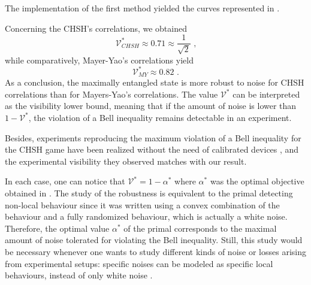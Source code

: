 The implementation of the first method yielded the curves represented in 
.

\begin{Figure}
\centering

\label{fig:curve-noise}
\end{Figure}

Concerning the CHSH's correlations, we obtained
\begin{equation*}
    \mathcal V ^*_{CHSH} \approx 0.71  \approx \frac{1}{\sqrt{2}}\text{ ,}
\end{equation*}
while comparatively, Mayer-Yao's correlations yield
\begin{equation*}
\mathcal{V}^*_{MY} \approx 0.82\text{ .}
\end{equation*}
As a conclusion, the maximally entangled state is more robust
to noise for CHSH correlations than for Mayers-Yao's correlations. The value $
\mathcal{V}^*$ can be interpreted as the visibility lower bound, meaning that if
the amount of noise is lower than $1-\mathcal{V}^*$, the violation of a Bell
inequality remains detectable in an experiment.

Besides, experiments reproducing the maximum violation of a Bell inequality for the CHSH
game have been realized without the need of calibrated devices
\cite{shadbolt2012}, and the experimental visibility they observed matches with
our result.

In each case, one can notice that $\mathcal{V}^* = 1 - \alpha^*$ where
$\alpha^*$ was the optimal objective obtained in .
The study of the robustness is equivalent to the primal detecting non-local
behaviour since it was written using a convex combination of the behaviour and a
fully randomized behaviour, which is actually a white noise. Therefore, the
optimal value $\alpha^*$ of the primal corresponds to the maximal amount of noise 
tolerated for violating the Bell inequality. Still, this study would be necessary
whenever one wants to study different kinds of noise or losses arising from experimental setups: specific noises can be modeled as specific local behaviours, instead of only white noise \cite{shadbolt2012}.
